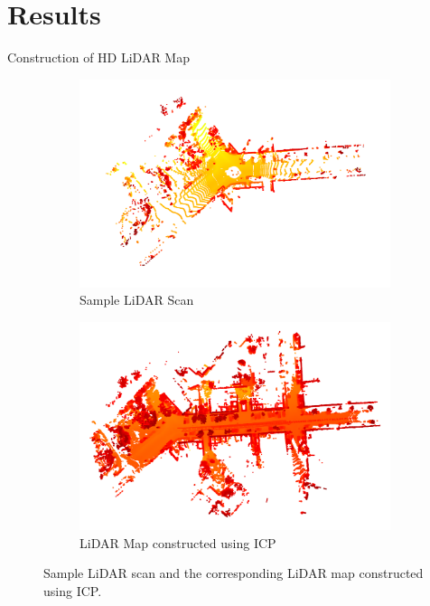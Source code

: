 \section{Results}

\begin{frame}{Construction of HD LiDAR Map}
    \begin{figure}
        \centering
        \begin{subfigure}[t]{0.49\textwidth}
            \centering
            \includegraphics[width=\textwidth]{figures/lidar_frame.png}
            \caption{Sample LiDAR Scan}
        \end{subfigure}
        \hfill
        \begin{subfigure}[t]{0.49\textwidth}
            \centering
            \includegraphics[width=\textwidth]{figures/lidar_map.png}
            \caption{LiDAR Map constructed using ICP}
        \end{subfigure}
    \caption{Sample LiDAR scan and the corresponding LiDAR map constructed using ICP.}
    \end{figure}
\end{frame}

